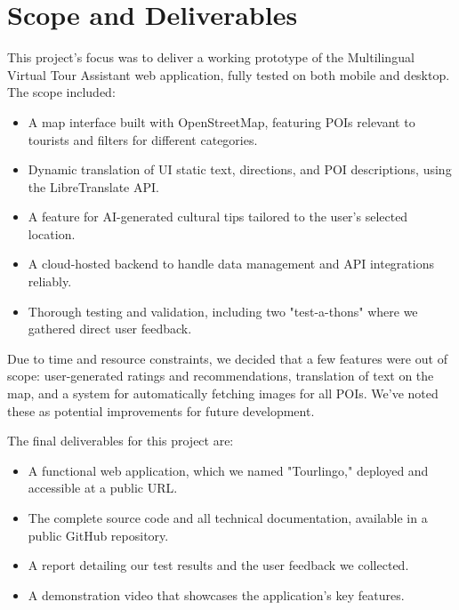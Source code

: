 \section{Scope and Deliverables}
This project's focus was to deliver a working prototype of the Multilingual Virtual Tour Assistant web application, fully tested on both mobile and desktop. The scope included:
\begin{itemize}
\item A map interface built with OpenStreetMap, featuring POIs relevant to tourists and filters for different categories.
\item Dynamic translation of UI static text, directions, and POI descriptions, using the LibreTranslate API.
\item A feature for AI-generated cultural tips tailored to the user’s selected location.
\item A cloud-hosted backend to handle data management and API integrations reliably.
\item Thorough testing and validation, including two "test-a-thons" where we gathered direct user feedback.
\end{itemize}

Due to time and resource constraints, we decided that a few features were out of scope: user-generated ratings and recommendations, translation of text on the map, and a system for automatically fetching images for all POIs. We've noted these as potential improvements for future development.

The final deliverables for this project are:
\begin{itemize}
    \item A functional web application, which we named "Tourlingo," deployed and accessible at a public URL.
    \item The complete source code and all technical documentation, available in a public GitHub repository.
    \item A report detailing our test results and the user feedback we collected.
    \item A demonstration video that showcases the application's key features.
\end{itemize}